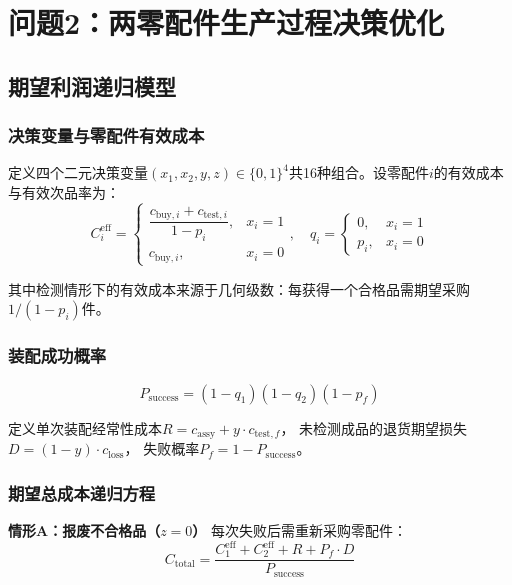 \documentclass[12pt,a4paper]{ctexart}
\begin{document}
\section{问题2：两零配件生产过程决策优化}

\subsection{期望利润递归模型}

\subsubsection{决策变量与零配件有效成本}

定义四个二元决策变量$(x_1,x_2,y,z) \in \{0,1\}^4$共16种组合。设零配件$i$的有效成本与有效次品率为：
\begin{equation}
    C_i^{\text{eff}} = \begin{cases}
        \dfrac{c_{\text{buy},i} + c_{\text{test},i}}{1 - p_i}, & x_i = 1 \\[8pt]
        c_{\text{buy},i}, & x_i = 0
    \end{cases}, \quad
    q_i = \begin{cases} 0, & x_i = 1 \\ p_i, & x_i = 0 \end{cases}
\end{equation}

其中检测情形下的有效成本来源于几何级数：每获得一个合格品需期望采购$1/(1-p_i)$件。

\subsubsection{装配成功概率}

\begin{equation}
    P_{\text{success}} = (1 - q_1)(1 - q_2)(1 - p_f)
\end{equation}

定义单次装配经常性成本$R = c_{\text{assy}} + y \cdot c_{\text{test},f}$，
未检测成品的退货期望损失$D = (1-y) \cdot c_{\text{loss}}$，
失败概率$P_f = 1 - P_{\text{success}}$。

\subsubsection{期望总成本递归方程}

\textbf{情形A：报废不合格品（$z=0$）} 每次失败后需重新采购零配件：
\begin{equation}
    C_{\text{total}} = \frac{C_1^{\text{eff}} + C_2^{\text{eff}} + R + P_f \cdot D}{P_{\text{success}}}
\end{equation}
\end{document}
